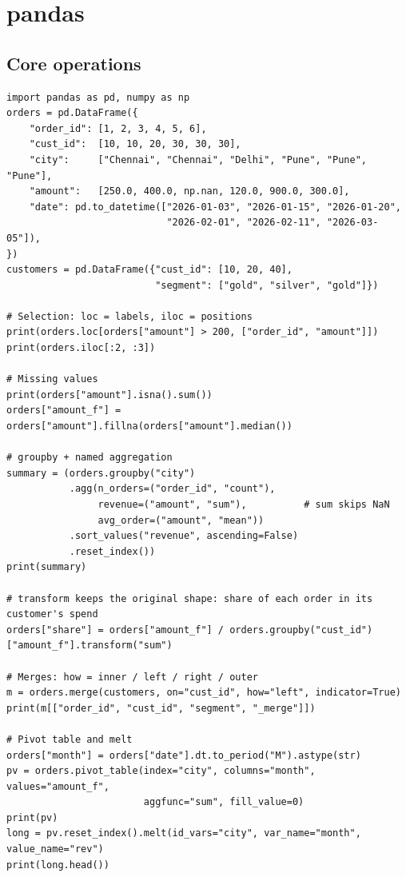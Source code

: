 \section{pandas}

\subsection{Core operations}
\begin{lstlisting}[style=python]
import pandas as pd, numpy as np
orders = pd.DataFrame({
    "order_id": [1, 2, 3, 4, 5, 6],
    "cust_id":  [10, 10, 20, 30, 30, 30],
    "city":     ["Chennai", "Chennai", "Delhi", "Pune", "Pune", "Pune"],
    "amount":   [250.0, 400.0, np.nan, 120.0, 900.0, 300.0],
    "date": pd.to_datetime(["2026-01-03", "2026-01-15", "2026-01-20",
                            "2026-02-01", "2026-02-11", "2026-03-05"]),
})
customers = pd.DataFrame({"cust_id": [10, 20, 40],
                          "segment": ["gold", "silver", "gold"]})

# Selection: loc = labels, iloc = positions
print(orders.loc[orders["amount"] > 200, ["order_id", "amount"]])
print(orders.iloc[:2, :3])

# Missing values
print(orders["amount"].isna().sum())
orders["amount_f"] = orders["amount"].fillna(orders["amount"].median())

# groupby + named aggregation
summary = (orders.groupby("city")
           .agg(n_orders=("order_id", "count"),
                revenue=("amount", "sum"),          # sum skips NaN
                avg_order=("amount", "mean"))
           .sort_values("revenue", ascending=False)
           .reset_index())
print(summary)

# transform keeps the original shape: share of each order in its customer's spend
orders["share"] = orders["amount_f"] / orders.groupby("cust_id")["amount_f"].transform("sum")

# Merges: how = inner / left / right / outer
m = orders.merge(customers, on="cust_id", how="left", indicator=True)
print(m[["order_id", "cust_id", "segment", "_merge"]])

# Pivot table and melt
orders["month"] = orders["date"].dt.to_period("M").astype(str)
pv = orders.pivot_table(index="city", columns="month", values="amount_f",
                        aggfunc="sum", fill_value=0)
print(pv)
long = pv.reset_index().melt(id_vars="city", var_name="month", value_name="rev")
print(long.head())
\end{lstlisting}


